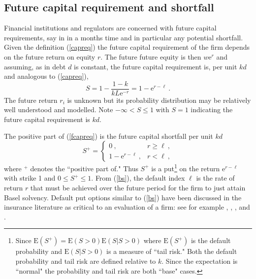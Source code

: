\documentclass[authoryear]{elsarticle}
\newcommand{\E}{\mathrm{E}}
\newcommand{\e}{\mathrm{e}}
\newcommand{\eref}[1]{(\ref{#1})}
\newcommand{\be}[1]{\begin{equation}\label{#1}}
\newcommand{\ee}{\end{equation}}
\begin{document}
\subsection{Future capital requirement and shortfall}

Financial institutions and regulators are concerned with future capital requirements, say in in a months time and in particular any potential shortfall.   Given the definition \eref{capreq}  the future capital requirement of the firm depends on the future return on equity $r$.   The future future equity is then  $w\e^{r}$ and assuming, as in \cite{brownlees2015} debt $d$ is constant, the  future capital requirement is, per unit $kd$ and analogous to \eref{capreq}, 
\be{fcapreq}
   S=1-\frac{1-k}{kL\e^{-r}} =1-\e^{r-\ell}\ .
\ee
The future return $r_i$ is unknown but its probability distribution may be relatively well understood and modelled.  Note $-\infty<S\le 1$ with $S=1$ indicating the future capital requirement is $kd$.

The positive part of \eref{fcapreq} is the future capital shortfall per unit $kd$
\be{bs}
S^+ = \left\{\begin{array}{lr} 0\ , & r\ge \ell\ ,\\ 1-\e^{r-\ell}\ , & r<\ell\ ,\end{array}\right.  
\ee
where $^+$ denotes the ``positive part of."  
Thus $S^+$ is  a put\footnote{Since $\E(S^+)=\E(S>0)\E(S|S>0)$ where   $\E(S^+)$ is the default probability  and $\E(S|S>0)$ is a measure of ``tail risk."   Both the default probability and tail risk are  defined relative to  $k$.  Since the expectation is ``normal" the probability and tail risk are both ``base" cases.} on the return $\e^{r-\ell}$ with strike 1 and $0\le S^+\le 1$.  From \eref{bs}, the  default index $\ell$ is the rate of return $r$ that must be achieved over the future period for the firm to just attain Basel solvency.   Default put options similar to \eref{bs} have been discussed in the insurance literature as critical to an evaluation of a firm:  see for
example \citet{merton1977analytic}, \citet{doherty1986price}, \citet{cummins1988risk}, \citet{myers2001capital} and \citet{sherris2006solvency}.
\end{document}
